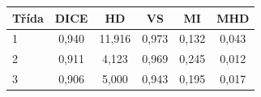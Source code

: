 \begin{tabular}{l c c c c c}
 \hline
Třída & DICE & HD & VS & MI & MHD \\ \hline
1 & 0,940 & 11,916 & 0,973 & 0,132 & 0,043 \\
2 & 0,911 & 4,123 & 0,969 & 0,245 & 0,012 \\
3 & 0,906 & 5,000 & 0,943 & 0,195 & 0,017 \\
\hline 
 \end{tabular}
